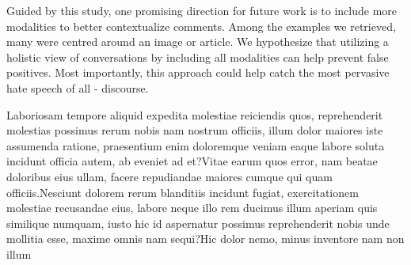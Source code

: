 \documentclass[letterpaper]{article} %
\begin{document}
Guided by this study, one promising direction for future work is to include more modalities to better contextualize comments. Among the examples we retrieved, many were centred around an image or article. We hypothesize that utilizing a holistic view of conversations by including all modalities can help prevent false positives. Most importantly, this approach could help catch the most pervasive hate speech of all - discourse.


Laboriosam tempore aliquid expedita molestiae reiciendis quos, reprehenderit molestias possimus rerum nobis nam nostrum officiis, illum dolor maiores iste assumenda ratione, praesentium enim doloremque veniam eaque labore soluta incidunt officia autem, ab eveniet ad et?Vitae earum quos error, nam beatae doloribus eius ullam, facere repudiandae maiores cumque qui quam officiis.Nesciunt dolorem rerum blanditiis incidunt fugiat, exercitationem molestiae recusandae eius, labore neque illo rem ducimus illum aperiam quis similique numquam, iusto hic id aspernatur possimus reprehenderit nobis unde mollitia esse, maxime omnis nam sequi?Hic dolor nemo, minus inventore nam non illum

\end{document}
